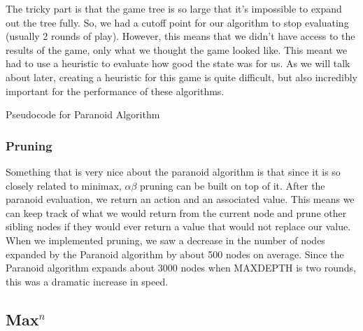 \documentclass[11pt]{article}
\begin{document}
The tricky part is that the game tree is so large that it's impossible to expand out the tree fully. So, we had a cutoff point for our algorithm to stop evaluating (usually 2 rounds of play). However, this means that we didn't have access to the results of the game, only what we thought the game looked like. This meant we had to use a heuristic to evaluate how good the state was for us. As we will talk about later, creating a heuristic for this game is quite difficult, but also incredibly important for the performance of these algorithms.

\begin{algorithm}
  \begin{algorithmic}
	\EndIf
		\EndFor
	\EndIf
		\EndFor
	\EndIf
    \EndProcedure{}
  \end{algorithmic}
  \caption{Pseudocode for Paranoid Algorithm}
\end{algorithm}

\subsubsection{Pruning}

Something that is very nice about the paranoid algorithm is that since it is so closely related to minimax, $\alpha\beta$ pruning can be built on top of it. After the paranoid evaluation, we return an action and an associated value. This means we can keep track of what we would return from the current node and prune other sibling nodes if they would ever return a value that would not replace our value. When we implemented pruning, we saw a decrease in the number of nodes expanded by the Paranoid algorithm by about 500 nodes on average. Since the Paranoid algorithm expands about 3000 nodes when MAXDEPTH is two rounds, this was a dramatic increase in speed.

\subsection{Max$^n$}
\end{document}
